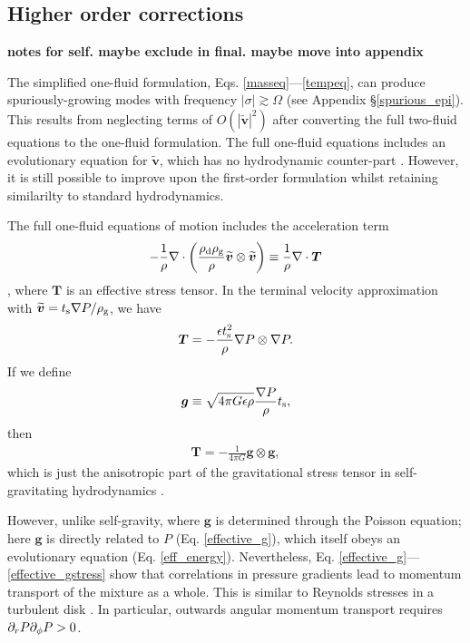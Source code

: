 \subsection{Higher order corrections}
{\bf notes for self. maybe exclude in final. maybe move into appendix}

The simplified one-fluid formulation, 
Eqs. \ref{masseq}---\ref{tempeq}, can 
produce spuriously-growing modes with frequency $|\sigma|\gtrsim
\Omega$ (see Appendix \S\ref{spurious_epi}). This 
results from neglecting terms of $O(|\widetilde{\bm{v}}|^2)$ after converting
the full two-fluid equations to the one-fluid formulation. The full
one-fluid equations 
 includes an evolutionary equation for $\widetilde{\bm{v}}$, which has no
 hydrodynamic counter-part \citep{laibe14}. However, it is
 still possible to improve upon 
 the first-order formulation whilst retaining similarilty to  
 standard hydrodynamics.  

The full one-fluid equations of motion includes the acceleration term 
\begin{align}
-\frac{1}{\rho}\nabla\cdot\left(\frac{\rho_\mathrm{d}\rho_\mathrm{g}}{\rho}\widetilde{\bm{v}}\otimes\widetilde{\bm{v}}\right) 
\equiv  \frac{1}{\rho}\nabla\cdot \bm{T} 
\end{align}
\citep{youdin05a}, 
where $\bm{T}$ is an effective stress tensor. 
In the terminal velocity
approximation with $\widetilde{\bm{v}} = t_\mathrm{s} 
\nabla P/\rho_\mathrm{g}$, we have 
\begin{align}
\bm{T} = - \frac{\epsilon t_\mathrm{s}^2}{\rho}\nabla P \otimes \nabla P.
\end{align}
If we define 
\begin{align}
  \bm{g} \equiv \sqrt{4\pi G \epsilon \rho} \frac{\nabla P}{\rho}
  t_\mathrm{s},\label{effective_g} 
\end{align}
then
\begin{align}
\bm{T} = - \frac{1}{4\pi G} \bm{g}\otimes\bm{g}, \label{effective_gstress}
\end{align}
which is just the anisotropic part of the  
gravitational stress tensor in self-gravitating hydrodynamics 
\citep{lynden-bell72}.

 However, unlike self-gravity, where $\bm{g}$ is
determined through the Poisson equation; here $\bm{g}$ is directly
related to $P$ (Eq. \ref{effective_g}), which itself obeys an 
evolutionary equation (Eq. \ref{eff_energy}). 
Nevertheless, Eq. \ref{effective_g}---\ref{effective_gstress}
show that correlations in  pressure gradients lead to 
momentum transport of the mixture as a whole. This is similar to Reynolds stresses in
a turbulent disk \citep{balbus99}. In particular, 
outwards angular momentum transport requires $\partial_rP\partial_\phi P > 0$.    

